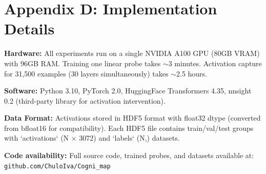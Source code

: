 \documentclass[letterpaper]{article}
\begin{document}
\section{Appendix D: Implementation Details}

\textbf{Hardware:} All experiments run on a single NVIDIA A100 GPU (80GB VRAM) with 96GB RAM. Training one linear probe takes $\sim$3 minutes. Activation capture for 31,500 examples (30 layers simultaneously) takes $\sim$2.5 hours.

\textbf{Software:} Python 3.10, PyTorch 2.0, HuggingFace Transformers 4.35, nnsight 0.2 (third-party library for activation intervention).

\textbf{Data Format:} Activations stored in HDF5 format with float32 dtype (converted from bfloat16 for compatibility). Each HDF5 file contains train/val/test groups with `activations` (N × 3072) and `labels` (N,) datasets.

\textbf{Code availability:} Full source code, trained probes, and datasets available at: \texttt{github.com/ChuloIva/Cogni\_map}
\end{document}
